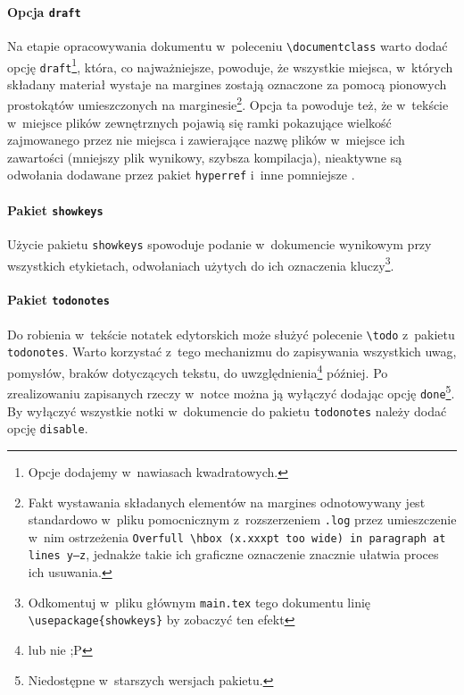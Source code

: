 \paragraph{Opcja \texttt{draft}} Na etapie opracowywania dokumentu w~poleceniu \texttt{\textbackslash documentclass} warto dodać opcję \texttt{draft}\footnote{Opcje dodajemy w~nawiasach kwadratowych.}, która, co najważniejsze, powoduje, że wszystkie miejsca, w~których składany materiał wystaje na margines zostają oznaczone za pomocą pionowych prostokątów umieszczonych na marginesie\footnote{Fakt wystawania składanych elementów na margines odnotowywany jest standardowo w~pliku pomocnicznym z~rozszerzeniem \texttt{.log}\footnotemark{} przez umieszczenie w~nim ostrzeżenia \texttt{Overfull \textbackslash{}hbox (x.xxxpt too wide) in paragraph at lines y--z}, jednakże takie ich graficzne oznaczenie znacznie ułatwia proces ich usuwania.}. Opcja ta powoduje też, że w~tekście w~miejsce plików zewnętrznych pojawią się ramki pokazujące wielkość zajmowanego przez nie miejsca i zawierające nazwę plików w~miejsce ich zawartości (mniejszy plik wynikowy, szybsza kompilacja), nieaktywne są odwołania dodawane przez pakiet \texttt{hyperref} i~inne pomniejsze \cite{draft_option}.\vspace{-4.5mm}

\paragraph{Pakiet \texttt{showkeys}} Użycie pakietu \texttt{showkeys} spowoduje podanie w~dokumencie wynikowym przy wszystkich etykietach, odwołaniach użytych do ich oznaczenia kluczy\footnote{Odkomentuj w~pliku głównym \texttt{main.tex} tego dokumentu linię \texttt{\textbackslash usepackage\{showkeys\}} by zobaczyć ten efekt \smiley}.\vspace{-4.5mm}

\paragraph{Pakiet \texttt{todonotes}} Do robienia w~tekście notatek edytorskich może służyć polecenie \texttt{\textbackslash todo} z~pakietu \texttt{todonotes}. Warto korzystać z~tego mechanizmu do zapisywania wszystkich uwag, pomysłów, braków dotyczących tekstu, do uwzględnienia\footnote{lub nie ;P} później. Po zrealizowaniu zapisanych rzeczy w~notce można ją wyłączyć dodając opcję \texttt{done}\footnote{Niedostępne w~starszych wersjach pakietu.}. By wyłączyć wszystkie notki w~dokumencie do pakietu \texttt{todonotes} należy dodać opcję \texttt{disable}.

